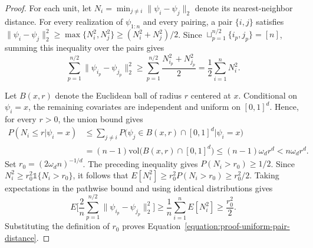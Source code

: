 \documentclass[letterpaper,12pt]{article}
\theoremstyle{definition}
\numberwithin{equation}{section}
\newcommand{\one}{\mathds{1}}
\begin{document}
\begin{proof}
For each unit, let $N_i=\min_{j\neq i}\|\psi_i-\psi_j\|_2$ denote its nearest-neighbor distance.
For every realization of $\psi_{1:n}$ and every pairing, a pair $\{i,j\}$ satisfies $\|\psi_i-\psi_j\|_2^2\geq\max\{N_i^2,N_j^2\}\geq(N_i^2+N_j^2)/2$.
Since $\sqcup_{p=1}^{n/2}\{i_p,j_p\}=[n]$, summing this inequality over the pairs gives
\begin{equation*}
\sum_{p=1}^{n/2}\|\psi_{i_p}-\psi_{j_p}\|_2^2\geq\sum_{p=1}^{n/2}\frac{N_{i_p}^2+N_{j_p}^2}{2}=\frac12\sum_{i=1}^nN_i^2.
\end{equation*}

Let $B(x,r)$ denote the Euclidean ball of radius $r$ centered at $x$.
Conditional on $\psi_i=x$, the remaining covariates are independent and uniform on $[0,1]^d$.
Hence, for every $r>0$, the union bound gives
\begin{align*}
P(N_i\leq r|\psi_i=x)&\leq\sum_{j\neq i}P\bigl(\psi_j\in B(x,r)\cap[0,1]^d|\psi_i=x\bigr)\\
&=(n-1)\mathrm{vol}\bigl(B(x,r)\cap[0,1]^d\bigr)\leq(n-1)\omega_dr^d<n\omega_dr^d.
\end{align*}
Set $r_0=(2\omega_d n)^{-1/d}$.
The preceding inequality gives $P(N_i>r_0)\geq1/2$.
Since $N_i^2\geq r_0^2\one\{N_i>r_0\}$, it follows that $E[N_i^2]\geq r_0^2P(N_i>r_0)\geq r_0^2/2$.
Taking expectations in the pathwise bound and using identical distributions gives
\begin{equation*}
E\bigg[\frac2n\sum_{p=1}^{n/2}\|\psi_{i_p}-\psi_{j_p}\|_2^2\bigg]\geq\frac1n\sum_{i=1}^nE[N_i^2]\geq\frac{r_0^2}{2}.
\end{equation*}
Substituting the definition of $r_0$ proves Equation~\eqref{equation:proof-uniform-pair-distance}.
\end{proof}
\end{document}
